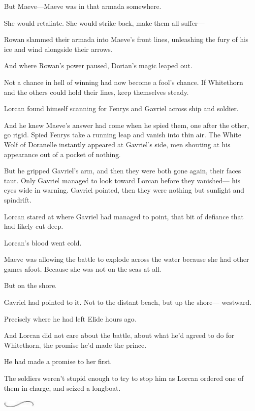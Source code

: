 But Maeve---Maeve was in that armada somewhere.

She would retaliate.
She would strike back, make them all suffer---

Rowan slammed their armada into Maeve's front lines, unleashing the fury of his ice and wind alongside their arrows.

And where Rowan's power paused, Dorian's magic leaped out.

Not a chance in hell of winning had now become a fool's chance.
If Whitethorn and the others could hold their lines, keep themselves steady.

Lorcan found himself scanning for Fenrys and Gavriel across ship and soldier.

And he knew Maeve's answer had come when he spied them, one after the other, go rigid.
Spied Fenrys take a running leap and vanish into thin air.
The White Wolf of Doranelle instantly appeared at Gavriel's side, men shouting at his appearance out of a pocket of nothing.

But he gripped Gavriel's arm, and then they were both gone again, their faces taut.
Only Gavriel managed to look toward Lorcan before they vanished--- his eyes wide in warning.
Gavriel pointed, then they were nothing but sunlight and spindrift.

Lorcan stared at where Gavriel had managed to point, that bit of defiance that had likely cut deep.

Lorcan's blood went cold.

Maeve was allowing the battle to explode across the water because she had other games afoot.
Because she was not on the seas at all.

But on the shore.

Gavriel had pointed to it.
Not to the distant beach, but up the shore--- westward.

Precisely where he had left Elide hours ago.

And Lorcan did not care about the battle, about what he'd agreed to do for Whitethorn, the promise he'd made the prince.

He had made a promise to her first.

The soldiers weren't stupid enough to try to stop him as Lorcan ordered one of them in charge, and seized a longboat.

\begin{center}
	\includegraphics[width=0.65in,height=0.13in]{images/seperator}
\end{center}

